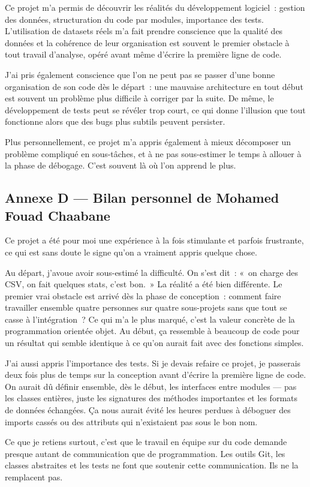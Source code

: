 \documentclass[12pt,a4paper]{article}
\begin{document}
\begin{bilanbox}
Ce projet m'a permis de découvrir les réalités du développement logiciel~: gestion des
données, structuration du code par modules, importance des tests. L'utilisation de datasets
réels m'a fait prendre conscience que la qualité des données et la cohérence de leur
organisation est souvent le premier obstacle à tout travail d'analyse, opéré avant même
d'écrire la première ligne de code.

\medskip
J'ai pris également conscience que l'on ne peut pas se passer d'une bonne organisation de son
code dès le départ~: une mauvaise architecture en tout début est souvent un problème plus
difficile à corriger par la suite. De même, le développement de tests peut se révéler trop
court, ce qui donne l'illusion que tout fonctionne alors que des bugs plus subtils peuvent
persister.

\medskip
Plus personnellement, ce projet m'a appris également à mieux décomposer un problème compliqué
en sous-tâches, et à ne pas sous-estimer le temps à allouer à la phase de débogage. C'est
souvent là où l'on apprend le plus.
\end{bilanbox}

\subsection*{Annexe D --- Bilan personnel de Mohamed Fouad Chaabane}

\begin{bilanbox}
Ce projet a été pour moi une expérience à la fois stimulante et parfois frustrante, ce qui
est sans doute le signe qu'on a vraiment appris quelque chose.

\medskip
Au départ, j'avoue avoir sous-estimé la difficulté. On s'est dit~: «~on charge des CSV, on
fait quelques stats, c'est bon.~» La réalité a été bien différente. Le premier vrai obstacle
est arrivé dès la phase de conception~: comment faire travailler ensemble quatre personnes sur
quatre sous-projets sans que tout se casse à l'intégration~? Ce qui m'a le plus marqué, c'est
la valeur concrète de la programmation orientée objet. Au début, ça ressemble à beaucoup de
code pour un résultat qui semble identique à ce qu'on aurait fait avec des fonctions simples.

\medskip
J'ai aussi appris l'importance des tests. Si je devais refaire ce projet, je passerais deux
fois plus de temps sur la conception avant d'écrire la première ligne de code. On aurait dû
définir ensemble, dès le début, les interfaces entre modules --- pas les classes entières,
juste les signatures des méthodes importantes et les formats de données échangées. Ça nous
aurait évité les heures perdues à déboguer des imports cassés ou des attributs qui n'existaient
pas sous le bon nom.

\medskip
Ce que je retiens surtout, c'est que le travail en équipe sur du code demande presque autant
de communication que de programmation. Les outils Git, les classes abstraites et les tests ne
font que soutenir cette communication. Ils ne la remplacent pas.
\end{bilanbox}
\end{document}
